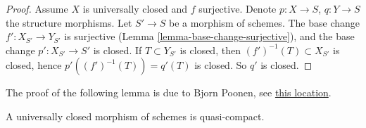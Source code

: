 \begin{proof}
Assume $X$ is universally closed and $f$ surjective.
Denote $p : X \to S$, $q : Y \to S$ the structure morphisms.
Let $S' \to S$ be a morphism of schemes. The base change
$f' : X_{S'} \to Y_{S'}$ is surjective
(Lemma \ref{lemma-base-change-surjective}), and the base
change $p' : X_{S'} \to S'$ is closed.
If $T \subset Y_{S'}$ is closed, then $(f')^{-1}(T) \subset X_{S'}$
is closed, hence $p'((f')^{-1}(T)) = q'(T)$ is closed.
So $q'$ is closed.
\end{proof}

\noindent
The proof of the following lemma is due to Bjorn Poonen, see
\href{http://mathoverflow.net/questions/23337/is-a-universally-closed-%
morphism-of-schemes-quasi-compact/23528#23528}{this location}.

\begin{lemma}
\label{lemma-universally-closed-quasi-compact}
A universally closed morphism of schemes is quasi-compact.
\end{lemma}


